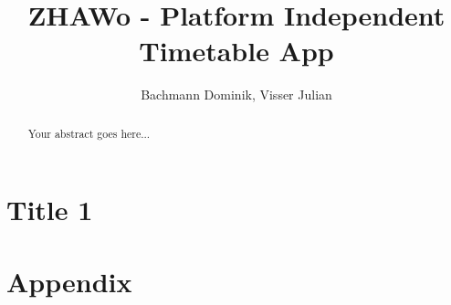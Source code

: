 \documentclass[english, a4paper,12pt]{article}
\title{ZHAWo - Platform Independent Timetable App}
\author{Bachmann Dominik, Visser Julian}
\begin{document}
	



	\newpage
	\tableofcontents
	\newpage
	\renewcommand{\abstractname}{Abstract}
	\begin{abstract}
		Your abstract goes here...
	\end{abstract}

	\newpage
	\section{Title 1}
	\blindtext
	\cite{DUMMY}

	\newpage

	\section{Appendix}

	\listoffigures
	\listoftables
	\printbibliography  %
\end{document}

